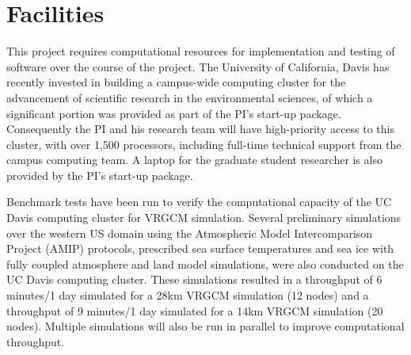 \documentclass[11pt]{article}
\begin{document}
\setcounter{section}{2}

\section{Facilities}

This project requires computational resources for implementation and testing of software over the course of the project. The University of California, Davis has recently invested in building a campus-wide computing cluster for the advancement of scientific research in the environmental sciences, of which a significant portion was provided as part of the PI's start-up package. Consequently the PI and his research team will have high-priority access to this cluster, with over 1,500 processors, including full-time technical support from the campus computing team. A laptop for the graduate student researcher is also provided by the PI's start-up package.

Benchmark tests have been run to verify the computational capacity of the UC Davis computing cluster for VRGCM simulation. Several preliminary simulations over the western US domain using the Atmospheric Model Intercomparison Project (AMIP) protocols, prescribed sea surface temperatures and sea ice with fully coupled atmosphere and land model simulations, were also conducted on the UC Davis computing cluster.  These simulations resulted in a  throughput of 6 minutes/1 day simulated for a 28km VRGCM simulation (12 nodes) and a throughput of 9 minutes/1 day simulated for a 14km VRGCM simulation (20 nodes).  Multiple simulations will also be run in parallel to improve computational throughput.
\end{document}
